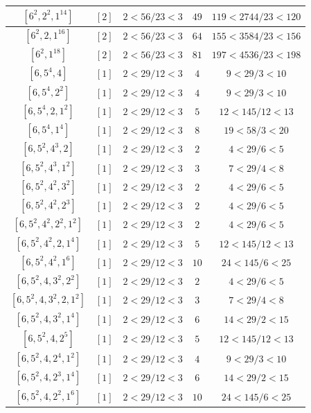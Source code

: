 \documentclass{article}%
\begin{document}
\begin{center}
\begin{longtable}{||c|c|c|c|c||}
$[6^{2}, 2^{2}, 1^{14}]$ & $[2]$ & $2 < 56/23 < 3$ & $49$ & $119 < 2744/23 < 120$ \\ \hline 
$[6^{2}, 2, 1^{16}]$ & $[2]$ & $2 < 56/23 < 3$ & $64$ & $155 < 3584/23 < 156$ \\ \hline 
$[6^{2}, 1^{18}]$ & $[2]$ & $2 < 56/23 < 3$ & $81$ & $197 < 4536/23 < 198$ \\ \hline 
$[6, 5^{4}, 4]$ & $[1]$ & $2 < 29/12 < 3$ & $4$ & $9 < 29/3 < 10$ \\ \hline 
$[6, 5^{4}, 2^{2}]$ & $[1]$ & $2 < 29/12 < 3$ & $4$ & $9 < 29/3 < 10$ \\ \hline 
$[6, 5^{4}, 2, 1^{2}]$ & $[1]$ & $2 < 29/12 < 3$ & $5$ & $12 < 145/12 < 13$ \\ \hline 
$[6, 5^{4}, 1^{4}]$ & $[1]$ & $2 < 29/12 < 3$ & $8$ & $19 < 58/3 < 20$ \\ \hline 
$[6, 5^{2}, 4^{3}, 2]$ & $[1]$ & $2 < 29/12 < 3$ & $2$ & $4 < 29/6 < 5$ \\ \hline 
$[6, 5^{2}, 4^{3}, 1^{2}]$ & $[1]$ & $2 < 29/12 < 3$ & $3$ & $7 < 29/4 < 8$ \\ \hline 
$[6, 5^{2}, 4^{2}, 3^{2}]$ & $[1]$ & $2 < 29/12 < 3$ & $2$ & $4 < 29/6 < 5$ \\ \hline 
$[6, 5^{2}, 4^{2}, 2^{3}]$ & $[1]$ & $2 < 29/12 < 3$ & $2$ & $4 < 29/6 < 5$ \\ \hline 
$[6, 5^{2}, 4^{2}, 2^{2}, 1^{2}]$ & $[1]$ & $2 < 29/12 < 3$ & $2$ & $4 < 29/6 < 5$ \\ \hline 
$[6, 5^{2}, 4^{2}, 2, 1^{4}]$ & $[1]$ & $2 < 29/12 < 3$ & $5$ & $12 < 145/12 < 13$ \\ \hline 
$[6, 5^{2}, 4^{2}, 1^{6}]$ & $[1]$ & $2 < 29/12 < 3$ & $10$ & $24 < 145/6 < 25$ \\ \hline 
$[6, 5^{2}, 4, 3^{2}, 2^{2}]$ & $[1]$ & $2 < 29/12 < 3$ & $2$ & $4 < 29/6 < 5$ \\ \hline 
$[6, 5^{2}, 4, 3^{2}, 2, 1^{2}]$ & $[1]$ & $2 < 29/12 < 3$ & $3$ & $7 < 29/4 < 8$ \\ \hline 
$[6, 5^{2}, 4, 3^{2}, 1^{4}]$ & $[1]$ & $2 < 29/12 < 3$ & $6$ & $14 < 29/2 < 15$ \\ \hline 
$[6, 5^{2}, 4, 2^{5}]$ & $[1]$ & $2 < 29/12 < 3$ & $5$ & $12 < 145/12 < 13$ \\ \hline 
$[6, 5^{2}, 4, 2^{4}, 1^{2}]$ & $[1]$ & $2 < 29/12 < 3$ & $4$ & $9 < 29/3 < 10$ \\ \hline 
$[6, 5^{2}, 4, 2^{3}, 1^{4}]$ & $[1]$ & $2 < 29/12 < 3$ & $6$ & $14 < 29/2 < 15$ \\ \hline 
$[6, 5^{2}, 4, 2^{2}, 1^{6}]$ & $[1]$ & $2 < 29/12 < 3$ & $10$ & $24 < 145/6 < 25$ \\ \hline 

\end{longtable}
\end{center}
\end{document}
